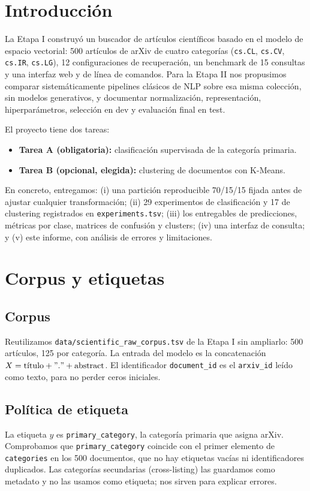 \documentclass[11pt,a4paper]{article}
\newcommand{\code}[1]{\texttt{#1}}
\begin{document}
\newpage
\section{Introducción}

La Etapa I construyó un buscador de artículos científicos basado en el modelo de espacio
vectorial: 500 artículos de arXiv de cuatro categorías (\code{cs.CL}, \code{cs.CV},
\code{cs.IR}, \code{cs.LG}), 12 configuraciones de recuperación, un benchmark de 15
consultas y una interfaz web y de línea de comandos. Para la Etapa II nos propusimos comparar
sistemáticamente pipelines clásicos de NLP sobre esa misma colección, sin modelos
generativos, y documentar normalización, representación, hiperparámetros, selección en dev
y evaluación final en test.

El proyecto tiene dos tareas:
\begin{itemize}[leftmargin=1.4em]
\item \textbf{Tarea A (obligatoria):} clasificación supervisada de la categoría primaria.
\item \textbf{Tarea B (opcional, elegida):} clustering de documentos con K-Means.
\end{itemize}

En concreto, entregamos: (i) una partición reproducible 70/15/15 fijada antes
de ajustar cualquier transformación; (ii) 29 experimentos de clasificación y 17 de
clustering registrados en \code{experiments.tsv}; (iii) los entregables de predicciones,
métricas por clase, matrices de confusión y clusters; (iv) una interfaz de consulta; y
(v) este informe, con análisis de errores y limitaciones.

\section{Corpus y etiquetas}

\subsection{Corpus}
Reutilizamos \code{data/scientific\_raw\_corpus.tsv} de la Etapa I sin ampliarlo: 500
artículos, 125 por categoría. La entrada del modelo es la concatenación
$X = \text{título} + ". " + \text{abstract}$. El identificador \code{document\_id} es el
\code{arxiv\_id} leído como texto, para no perder ceros iniciales.

\subsection{Política de etiqueta}
La etiqueta $y$ es \code{primary\_category}, la categoría primaria que asigna arXiv. Comprobamos que \code{primary\_category} coincide con el primer elemento de \code{categories}
en los 500 documentos, que no hay etiquetas vacías ni identificadores duplicados. Las
categorías secundarias (cross-listing) las guardamos como metadato y no las usamos
como etiqueta; nos sirven para explicar errores.
\end{document}
